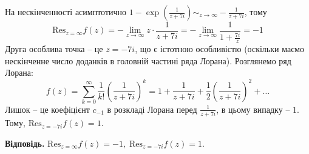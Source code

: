 \documentclass[oneside,solution]{karazin-complan-assign}
\begin{document}
На нескінченності асимптотично $1-\exp\left(\frac{1}{z+7i}\right) \sim_{z \to \infty} -\frac{1}{z+7i}$, тому
\begin{equation}
    \text{Res}_{z=\infty}f(z) = -\lim_{z \to \infty} z \cdot \frac{1}{z+7i} = -\lim_{z \to \infty} \frac{1}{1+\frac{7i}{z}} = -1
\end{equation}
Друга особлива точка -- це $z=-7i$, що є істотною особливістю (оскільки маємо нескінченне число доданків в головній частині ряда Лорана). Розглянемо ряд Лорана:
\begin{equation}
    f(z) = \sum_{k=0}^{\infty}\frac{1}{k!}\left(\frac{1}{z+7i}\right)^k = 1 + \frac{1}{z+7i} + \frac{1}{2}\left(\frac{1}{z+7i}\right)^2 + \dots
\end{equation}
Лишок -- це коефіцієнт $c_{-1}$ в розкладі Лорана перед $\frac{1}{z+7i}$, в цьому випадку -- $1$. Тому, $\text{Res}_{z=-7i}f(z)=1$.

\textbf{Відповідь.} $\text{Res}_{z=\infty}f(z)=-1,\;\text{Res}_{z=-7i}f(z)=1$. 
\end{document}
